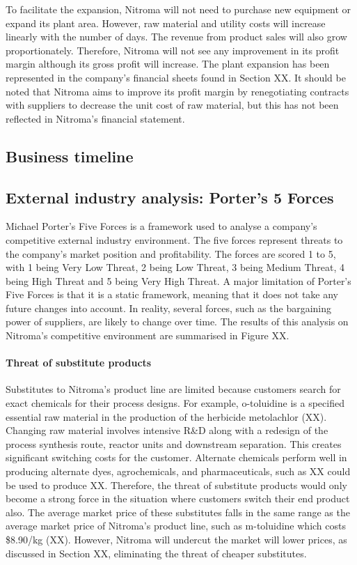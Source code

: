 To facilitate the expansion, Nitroma will not need to purchase new equipment or expand its plant area. However, raw material and utility costs will increase linearly with the number of days. The revenue from product sales will also grow proportionately. Therefore, Nitroma will not see any improvement in its profit margin although its gross profit will increase. The plant expansion has been represented in the company’s financial sheets found in Section XX. It should be noted that Nitroma aims to improve its profit margin by renegotiating contracts with suppliers to decrease the unit cost of raw material, but this has not been reflected in Nitroma’s financial statement. 

\subsection{Business timeline}

\subsection{External industry analysis: Porter's 5 Forces}
Michael Porter’s Five Forces is a framework used to analyse a company’s competitive external industry environment. The five forces represent threats to the company’s market position and profitability. The forces are scored 1 to 5, with 1 being Very Low Threat, 2 being Low Threat, 3 being Medium Threat, 4 being High Threat and 5 being Very High Threat. A major limitation of Porter’s Five Forces is that it is a static framework, meaning that it does not take any future changes into account. In reality, several forces, such as the bargaining power of suppliers, are likely to change over time. The results of this analysis on Nitroma’s competitive environment are summarised in Figure XX.

\paragraph{Threat of substitute products}
Substitutes to Nitroma’s product line are limited because customers search for exact chemicals for their process designs. For example, o-toluidine is a specified essential raw material in the production of the herbicide metolachlor (XX). Changing raw material involves intensive R\&D along with a redesign of the process synthesis route, reactor units and downstream separation. This creates significant switching costs for the customer. Alternate chemicals perform well in producing alternate dyes, agrochemicals, and pharmaceuticals, such as XX could be used to produce XX. Therefore, the threat of substitute products would only become a strong force in the situation where customers switch their end product also. The average market price of these substitutes falls in the same range as the average market price of Nitroma’s product line, such as m-toluidine which costs \$8.90/kg (XX). However, Nitroma will undercut the market will lower prices, as discussed in Section XX, eliminating the threat of cheaper substitutes.


